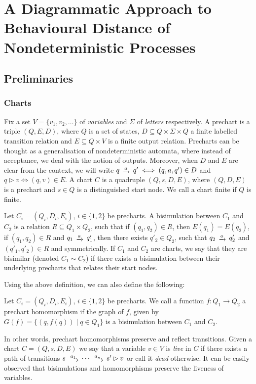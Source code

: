 \chapter{A Diagrammatic Approach to Behavioural Distance of Nondeterministic Processes}
\label{chapter3}

\section{Preliminaries}\label{c3:sec:preliminaries}
\subsection{Charts}
Fix a set $V=\{v_1, v_2, \dots\}$ of \emph{variables} and $\Sigma$ of \emph{letters} respectively. A prechart is a triple $(Q,E,D)$, where $Q$ is a set of states, $D \subseteq Q \times \Sigma \times Q$ a finite labelled transition relation and $E \subseteq Q \times V$ is a finite output relation. Precharts can be thought as a generalisation of nondeterministic automata, where instead of acceptance, we deal with the notion of outputs. Moreover, when $D$ and $E$ are clear from the context, we will write $q \tr{a} q' \iff (q,a,q') \in D$ and $q \rhd v \iff (q,v) \in E$. A chart $C$ is a quadruple $(Q, s, D, E)$, where $(Q,D,E)$ is a prechart and $s \in Q$ is a distinguished start node. We call a chart finite if $Q$ is finite.
\begin{definition}
	Let $C_i = (Q_i,D_i,E_i)$, $i \in \{1,2\}$ be precharts. A bisimulation between $C_1$ and $C_2$ is a relation ${R} \subseteq Q_1 \times Q_2$, such that  if $(q_1,q_2)\in R$, then $E(q_1)=E(q_2)$,  if $(q_1,q_2) \in R$ and $q_1 \tr{a} q'_1$, then there exists $q'_2 \in Q_2$, such that $q_2 \tr{a} q'_2$ and $(q'_1, q'_2) \in R$ and symmetrically. If $C_1$ and $C_2$ are charts, we say that they are bisimilar (denoted $C_1 \sim C_2$) if there exists a bisimulation between their underlying precharts that relates their start nodes.
\end{definition}
Using the above definition, we can also define the following:
\begin{definition}
	 Let $C_i = (Q_i,D_i,E_i)$, $i \in \{1,2\}$ be precharts. We call a function $f \colon Q_1 \to Q_2$ a prechart homomorphism if the graph of $f$, given by $G(f) = \{(q,f(q)) \mid q \in Q_1\}$ is a bisimulation between $C_1$ and $C_2$.
\end{definition}
In other words, prechart homomorphisms preserve and reflect transitions. Given a chart $C=(Q,s,D,E)$ we say that a variable $v \in V$ is \emph{live} in $C$ if there exists a path of transitions $s \tr{a_1} \dots \tr{a_n} s' \rhd v$ or call it \emph{dead} otherwise. It can be easily observed that bisimulations and homomorphisms preserve the liveness of variables.

